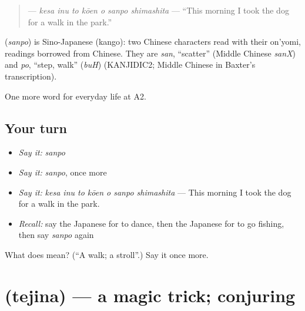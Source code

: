 \begin{quote}
\textbf{   } — \emph{kesa inu to kōen o sanpo shimashita} — \textquotedblleft{}This morning I took the dog for a walk in the park.\textquotedblright{}
\end{quote}

\begin{cousinweb}
\textbf{} (\emph{sanpo}) is Sino-Japanese (kango): two Chinese characters read with their on'yomi, readings borrowed from Chinese. They are \emph{san}, \textquotedblleft{}scatter\textquotedblright{} (Middle Chinese \emph{sanX}) and \emph{po}, \textquotedblleft{}step, walk\textquotedblright{} (\emph{buH}) (KANJIDIC2; Middle Chinese in Baxter's transcription).
\end{cousinweb}

\begin{grammarlens}[title={What you've built}]
One more word for everyday life at A2.
\end{grammarlens}

\subsection*{Your turn}
\begin{itemize}
\raggedright
  \item \emph{Say it:} \emph{sanpo}
  \item \emph{Say it:} \emph{sanpo}, once more
  \item \emph{Say it:} \emph{kesa inu to kōen o sanpo shimashita} — This morning I took the dog for a walk in the park.
  \item \emph{Recall:} say the Japanese for to dance, then the Japanese for to go fishing, then say \emph{sanpo} again
\end{itemize}

\begin{tcolorbox}[breakable,colback=teal!4,colframe=teal!35!black,title={Before you move on}]
What does  mean? (\textquotedblleft{}A walk; a stroll\textquotedblright{}.) Say it once more.
\end{tcolorbox}
\section[\texorpdfstring{\ja{てじな} (tejina)}{てじな (tejina)}]{ (tejina) — a magic trick; conjuring}

\label{lesson:JA-C239-tejina}



